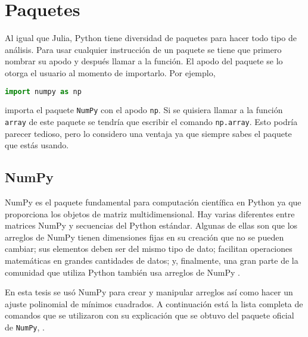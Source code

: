\section{Paquetes}
Al igual que \textsf{Julia}, \textsf{Python} tiene diversidad de paquetes para hacer todo tipo de análisis. Para usar cualquier instrucción de un paquete se tiene que primero nombrar su apodo y después llamar a la función. El apodo del paquete se lo otorga el usuario al momento de importarlo. Por ejemplo, 
\begin{lstlisting}[language=Python]
	import numpy as np
\end{lstlisting}

\noindent importa el paquete \texttt{NumPy} con el apodo \texttt{np}. Si se quisiera llamar a la función \texttt{array} de este paquete se tendría que escribir el comando \texttt{np.array}. Esto podría parecer tedioso, pero lo considero una ventaja ya que siempre sabes el paquete que estás usando. 

\subsection{NumPy} \label{seccion_numpy}
NumPy es el paquete fundamental para computación científica en \textsf{Python} ya que proporciona los objetos de matriz multidimensional.
Hay varias diferentes entre matrices NumPy y secuencias del \textsf{Python} estándar. Algunas de ellas son que los arreglos de NumPy tienen dimensiones fijas en su creación que no se pueden cambiar; sus elementos deben ser del mismo tipo de dato; facilitan operaciones matemáticas en grandes cantidades de datos; y, finalmente, una gran parte de la comunidad que utiliza \textsf{Python} también usa arreglos de NumPy \cite{numpy_manual}. 

En esta tesis se usó NumPy para crear y manipular arreglos así como hacer un ajuste polinomial de mínimos cuadrados. A continuación está la lista completa de comandos que se utilizaron con su explicación que se obtuvo del paquete oficial de \texttt{NumPy}, \cite{numpy_manual}. 

